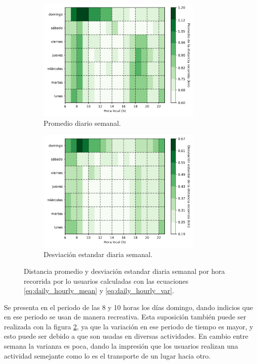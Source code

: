 \begin{figure}[H]
    \centering
    \begin{subfigure}[b]{8cm}
        \includegraphics[width=8cm]{Graphics/daily_hourly_mean_distance.png}
        \caption{Promedio diario semanal.}
        \label{fig:daily_hourly_mean_distance}
    \end{subfigure}
    \begin{subfigure}[b]{8cm}
        \includegraphics[width=8cm]{Graphics/daily_hourly_var_distance.png}
        \caption{Desviación estandar diaria semanal.}
        \label{fig:daily_hourly_var_distance}
    \end{subfigure}
    \caption{Distancia promedio y desviación estandar diaria semanal por hora recorrida por lo usuarios calculadas con las ecuaciones \ref{eq:daily_hourly_mean} y \ref{eq:daily_hourly_var}.}
    \label{fig:daily_hourly_distance}
\end{figure}

Se presenta en el periodo de las 8 y 10 horas los días domingo, dando indicios que en ese periodo se usan de manera recreativa. Esta suposición también puede ser realizada con la figura \ref{fig:daily_hourly_var_distance}, ya que la variación en ese periodo de tiempo es mayor, y esto puede ser debido a que son usadas en diversas actividades. En cambio entre semana la varianza es poca, dando la impresión que los usuarios realizan una actividad semejante como lo es el transporte de un lugar hacia otro.


